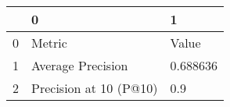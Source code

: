 \begin{tabular}{lll}
\toprule
{} &                       0 &         1 \\
\midrule
0 &                  Metric &     Value \\
1 &       Average Precision &  0.688636 \\
2 &  Precision at 10 (P@10) &       0.9 \\
\bottomrule
\end{tabular}
